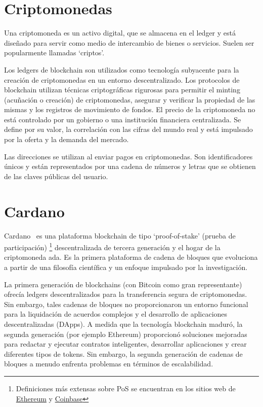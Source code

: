 \documentclass[12pt]{book}
\begin{document}
\section{Criptomonedas}

Una criptomoneda es un activo digital, que se almacena en el ledger y está diseñado para servir como medio de intercambio de bienes o servicios. Suelen ser popularmente llamadas `criptos'.

Los ledgers de blockchain son utilizados como tecnología subyacente para la creación de criptomonedas en un entorno descentralizado. Los protocolos de blockchain utilizan técnicas criptográficas rigurosas para permitir el minting (acuñación o creación) de criptomonedas, asegurar y verificar la propiedad de las mismas y los registros de movimiento de fondos. El precio de la criptomoneda no está controlado por un gobierno o una institución financiera centralizada. Se define por su valor, la correlación con las cifras del mundo real y está impulsado por la oferta y la demanda del mercado.

Las direcciones se utilizan al enviar pagos en criptomonedas. Son identificadores únicos y están representados por una cadena de números y letras que se obtienen de las claves públicas del usuario.

\section{Cardano}

Cardano~\cite{cardano_docs} es una plataforma blockchain de tipo `proof-of-stake' (prueba de participación)
\footnote{Definiciones más extensas sobre PoS se encuentran en los sitios web de \href{https://ethereum.org/en/developers/docs/consensus-mechanisms/pos/}{Ethereum} y \href{https://www.coinbase.com/es/learn/crypto-basics/what-is-proof-of-work-or-proof-of-stake}{Coinbase}}
descentralizada de tercera generación y el hogar de la criptomoneda ada. Es la primera plataforma de cadena de bloques que evoluciona a partir de una filosofía científica y un enfoque impulsado por la investigación.

La primera generación de blockchains (con Bitcoin como gran representante) ofrecía ledgers descentralizados para la transferencia segura de criptomonedas. Sin embargo, tales cadenas de bloques no proporcionaron un entorno funcional para la liquidación de acuerdos complejos y el desarrollo de aplicaciones descentralizadas (DApps). A medida que la tecnología blockchain maduró, la segunda generación (por ejemplo Ethereum) proporcionó soluciones mejoradas para redactar y ejecutar contratos inteligentes, desarrollar aplicaciones y crear diferentes tipos de tokens. Sin embargo, la segunda generación de cadenas de bloques a menudo enfrenta problemas en términos de escalabilidad.
\end{document}
